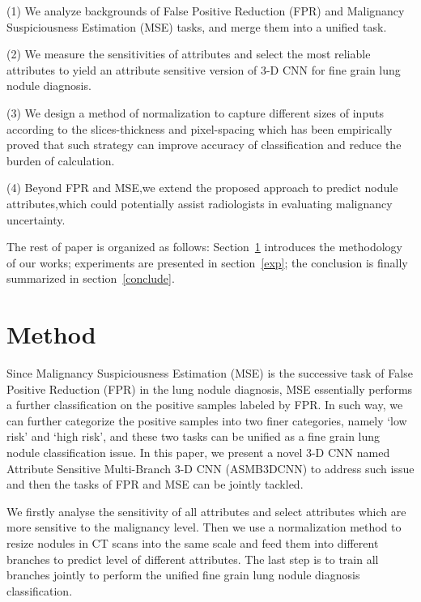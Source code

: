 \documentclass[runningheads]{llncs}
\begin{document}
(1) We analyze backgrounds of False Positive Reduction (FPR) and  Malignancy Suspiciousness Estimation (MSE) tasks, and merge them into a unified task.

(2) We measure the sensitivities of attributes and select the most reliable attributes to yield an attribute sensitive version of 3-D CNN for fine grain lung nodule diagnosis.

(3) We design a method of normalization to capture different sizes of inputs according to the slices-thickness and pixel-spacing which has been empirically proved that such strategy can improve accuracy of classification and reduce the burden of calculation.

(4) Beyond FPR and MSE,we extend the proposed approach to predict nodule attributes,which could potentially assist radiologists in evaluating malignancy uncertainty.

The rest of paper is organized as follows: Section~\ref{method} introduces the methodology of our works; experiments are presented in section~\ref{exp}; the conclusion is finally summarized in section~\ref{conclude}.



\section{Method}
\label{method}
Since Malignancy Suspiciousness Estimation (MSE) is the successive task of False Positive Reduction (FPR) in the lung nodule diagnosis, MSE essentially performs a further classification on the positive samples labeled by FPR. In such way, we can further categorize the positive samples into two finer categories, namely `low risk' and `high risk', and these two tasks can be unified as a fine grain lung nodule classification issue. In this paper, we present a novel 3-D CNN named  Attribute Sensitive Multi-Branch 3-D CNN (ASMB3DCNN) to address such issue and then the tasks of FPR and MSE can be jointly tackled. 

We firstly analyse the sensitivity of all attributes and select attributes which are more sensitive to the malignancy level.  Then we use a normalization method to resize nodules in CT scans into the same scale and feed them into different branches to predict level of different attributes. The last step is to train all branches jointly to perform the unified fine grain lung nodule diagnosis classification.
\end{document}
